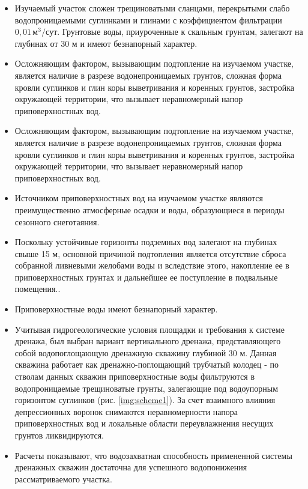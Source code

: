 \documentclass[a4paper,12pt]{article} %
\begin{document}
\begin{itemize}

\item Изучаемый участок сложен  трещиноватыми  сланцами, перекрытыми слабо водопроницаемыми суглинками и глинами с коэффициентом фильтрации $0,01 \, м^3/сут$. Грунтовые воды, приуроченные к скальным грунтам, залегают на глубинах от 30 м и имеют безнапорный характер.
\item Осложняющим фактором, вызывающим подтопление на изучаемом участке, является наличие в разрезе водонепроницаемых грунтов, сложная форма кровли суглинков и глин коры выветривания и коренных грунтов, застройка окружающей территории, что вызывает неравномерный напор приповерхностных вод.
\item Осложняющим фактором, вызывающим подтопление на изучаемом участке, является наличие в разрезе водонепроницаемых грунтов, сложная форма кровли суглинков и глин коры выветривания и коренных грунтов, застройка окружающей территории, что вызывает неравномерный напор приповерхностных вод.
\item Источником приповерхностных вод на изучаемом участке являются преимущественно атмосферные осадки и воды, образующиеся в периоды сезонного снеготаяния.
\item Поскольку устойчивые горизонты подземных вод залегают на глубинах свыше 15 м, основной причиной подтопления является отсутствие сброса собранной ливневыми желобами воды и вследствие этого, накопление ее в приповерхностных грунтах и дальнейшее ее поступление в подвальные помещения..
\item Приповерхностные воды имеют безнапорный характер.
\item Учитывая гидрогеологические условия площадки и требования к системе дренажа, был выбран вариант вертикального дренажа, представляющего собой водопоглощающую дренажную скважину глубиной 30 м. Данная скважина работает как дренажно-поглощающий трубчатый колодец - по стволам данных скважин приповерхностные воды фильтруются в водопроницаемые трещиноватые грунты, залегающие под  водоупорным горизонтом суглинков (рис. \ref{img:scheme1}). За счет взаимного влияния депрессионных воронок снимаются неравномерности напора приповерхностных вод и локальные области переувлажнения несущих грунтов ликвидируются. 
\item Расчеты показывают, что водозахватная способность примененной системы дренажных скважин достаточна для успешного водопонижения рассматриваемого участка.

\end{itemize}
\end{document}
